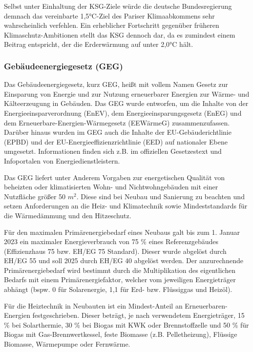 				Selbst unter Einhaltung der KSG-Ziele würde die deutsche Bundesregierung demnach das vereinbarte 1,5°C-Ziel des Pariser Klimaabkommens sehr wahrscheinlich verfehlen. Ein erheblicher Fortschritt gegenüber früheren Klimaschutz-Ambitionen stellt das KSG dennoch dar, da es zumindest einem Beitrag entspricht, der die Erderwärmung auf unter 2,0°C hält. 
			
			\subsubsection{Gebäudeenergiegesetz (GEG)}
			
				Das Gebäudeenergiegesetz, kurz GEG, heißt mit vollem Namen \frqq Gesetz zur Einsparung von Energie und zur Nutzung erneuerbarer Energien zur Wärme- und Kälteerzeugung in Gebäuden\flqq.
				Das GEG wurde entworfen, um die Inhalte von der Energieeinsparverordnung (EnEV), dem Energieeinsparungsgesetz (EnEG) und dem Erneuerbare-Energien-Wärmegesetz (EEWärmeG) zusammenzufassen. Darüber hinaus wurden im GEG auch die Inhalte der EU-Gebäuderichtlinie (EPBD) und der EU-Energieeffizienzrichtlinie (EED) auf nationaler Ebene umgesetzt. Informationen finden sich z.B. im offiziellen Gesetzestext und Infoportalen von Energiedienstleistern. \cite{web_gesetze_geg}\cite{web_geg_info_heizungsfinder}\cite{web_geg_info_energieexperten}
				
				Das GEG liefert unter Anderem Vorgaben zur energetischen Qualität von beheizten oder klimatisierten Wohn- und Nichtwohngebäuden mit einer Nutzfläche größer 50 $m^2$. Diese sind bei Neubau und Sanierung zu beachten und setzen Anforderungen an die Heiz- und Klimatechnik sowie Mindeststandards für die Wärmedämmung und den Hitzeschutz. \cite{web_geg_info_heizungsfinder}
				
				Für den maximalen Primärenergiebedarf eines Neubaus galt bis zum 1. Januar 2023 ein maximaler Energieverbrauch von 75 \% eines Referenzgebäudes (Effizienzhaus 75 bzw. EH/EG 75 Standard). Dieser wurde abgelöst durch EH/EG 55 und soll 2025 durch EH/EG 40 abgelöst werden. Der anzurechnende Primärenergiebedarf wird bestimmt durch die Multiplikation des eigentlichen Bedarfs mit einem Primärenergiefaktor, welcher vom jeweiligen Energieträger abhängt (bspw. 0 für Solarenergie, 1,1 für Erd- bzw. Flüssiggas und Heizöl).\cite{web_geg_info_heizungsfinder}\cite{web_geg_info_energieexperten}
				
				Für die Heiztechnik in Neubauten ist ein Mindest-Anteil an Erneuerbaren-Energien festgeschrieben. Dieser beträgt, je nach verwendetem Energieträger, 15 \% bei Solarthermie, 30 \% bei Biogas mit KWK oder Brennstoffzelle und 50 \% für Biogas mit Gas-Brennwertkessel, feste Biomasse (z.B. Pelletheizung), Flüssige Biomasse, Wärmepumpe oder Fernwärme. \cite{web_geg_info_heizungsfinder}\cite{web_geg_info_energieexperten}
				
